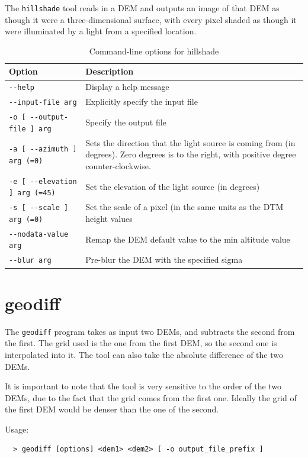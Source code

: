 The \verb#hillshade# tool reads in a DEM and outputs an image of that
DEM as though it were a three-dimensional surface, with every pixel
shaded as though it were illuminated by a light from a specified
location.

\begin{longtable}{|l|p{11cm}|}
\caption{Command-line options for hillshade}
\label{tbl:hillshade}
\endfirsthead
\endhead
\endfoot
\endlastfoot
\hline
Option & Description \\ \hline \hline
\verb#--help# & Display a help message\\ \hline
\verb#--input-file arg# & Explicitly specify the input file\\ \hline
\verb#-o [ --output-file ] arg# & Specify the output file\\ \hline
\verb#-a [ --azimuth ] arg (=0)# & Sets the direction that the light source is coming from (in degrees).  Zero degrees is to the right, with positive degree counter-clockwise.\\ \hline
\verb#-e [ --elevation ] arg (=45)# & Set the elevation of the light source (in degrees)\\ \hline
\verb#-s [ --scale ] arg (=0)# & Set the scale of a pixel (in the same units as the DTM height values\\ \hline
\verb#--nodata-value arg# & Remap the DEM default value to the min altitude value\\ \hline
\verb#--blur arg# & Pre-blur the DEM with the specified sigma\\ \hline
\end{longtable}

\section{geodiff}
\label{geodiff}

The \texttt{geodiff} program takes as input two DEMs, and subtracts the second from the first. The grid used is the one from the first DEM, so the second one is interpolated into it. The tool can also take the absolute difference of the two DEMs.

It is important to note that the tool is very sensitive to the order of
the two DEMs, due to the fact that the grid comes from the first one. Ideally the grid of the first DEM would be denser than the one of the second.

\medskip

Usage:
\begin{verbatim}
  > geodiff [options] <dem1> <dem2> [ -o output_file_prefix ]
\end{verbatim}


